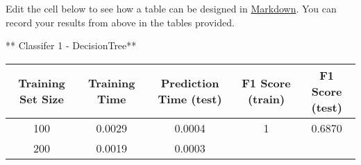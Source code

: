 \documentclass{ctexart}
\begin{document}
Edit the cell below to see how a table can be designed in
\href{https://github.com/adam-p/markdown-here/wiki/Markdown-Cheatsheet\#tables}{Markdown}.
You can record your results from above in the tables provided.

    ** Classifer 1 - DecisionTree**

\begin{longtable}[]{@{}ccccc@{}}
\toprule
\begin{minipage}[b]{0.16\columnwidth}\centering\strut
Training Set Size\strut
\end{minipage} & \begin{minipage}[b]{0.21\columnwidth}\centering\strut
Training Time\strut
\end{minipage} & \begin{minipage}[b]{0.20\columnwidth}\centering\strut
Prediction Time (test)\strut
\end{minipage} & \begin{minipage}[b]{0.15\columnwidth}\centering\strut
F1 Score (train)\strut
\end{minipage} & \begin{minipage}[b]{0.14\columnwidth}\centering\strut
F1 Score (test)\strut
\end{minipage}\tabularnewline
\midrule
\endhead
\begin{minipage}[t]{0.16\columnwidth}\centering\strut
100\strut
\end{minipage} & \begin{minipage}[t]{0.21\columnwidth}\centering\strut
0.0029\strut
\end{minipage} & \begin{minipage}[t]{0.20\columnwidth}\centering\strut
0.0004\strut
\end{minipage} & \begin{minipage}[t]{0.15\columnwidth}\centering\strut
1\strut
\end{minipage} & \begin{minipage}[t]{0.14\columnwidth}\centering\strut
0.6870\strut
\end{minipage}\tabularnewline
\begin{minipage}[t]{0.16\columnwidth}\centering\strut
200\strut
\end{minipage} & \begin{minipage}[t]{0.21\columnwidth}\centering\strut
0.0019\strut
\end{minipage} & \begin{minipage}[t]{0.20\columnwidth}\centering\strut
0.0003\strut
\end{minipage} & \begin{minipage}[t]{0.15\columnwidth}\centering\strut

\end{minipage}
\end{longtable}
\end{document}
